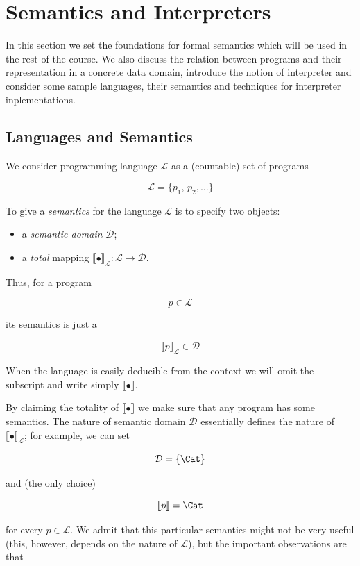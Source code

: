 \documentclass{article}
\newcommand{\sembr}[1]{\llbracket{#1}\rrbracket}
\newcommand{\ph}{{\phantom{x}}}
\begin{document}
\section{Semantics and Interpreters}

In this section we set the foundations for formal semantics which will be used in the rest of the course. We also discuss the
relation between programs and their representation in a concrete data domain, introduce the notion of interpreter and
consider some sample languages, their semantics and techniques for interpreter inplementations.

\subsection{Languages and Semantics}

We consider programming language $\mathcal L$ as a (countable) set of programs

\[
\mathcal{L}=\{p_1,\,p_2,\dots\}
\]

To give a \emph{semantics} for the language $\mathcal L$ is to specify two objects:

\begin{itemize}
\item a \emph{semantic domain} $\mathcal D$;
\item a \emph{total} mapping $\sembr{\bullet}^\ph_{\mathcal L} : \mathcal L \to \mathcal D$.
\end{itemize}

Thus, for a program

\[
p\in\mathcal L
\]

its semantics is just a

\[
\sembr{p}^\ph_{\mathcal L}\in\mathcal D
\]

When the language is easily deducible from the context we will omit the subscript and write simply $\sembr{\bullet}$.

By claiming the totality of $\sembr{\bullet}$ we 
make sure that any program has some semantics. The nature of semantic domain $\mathcal D$ essentially defines the nature of $\sembr{\bullet}_{\mathcal L}$;
for example, we can set

\[
\mathcal D=\{\Cat\}
\]

and (the only choice)

\[
\sembr{p}=\Cat
\]

for every $p\in\mathcal L$. We admit that this particular
semantics might not be very useful (this, however, depends on the nature of $\mathcal L$), but the important observations are that
\end{document}
